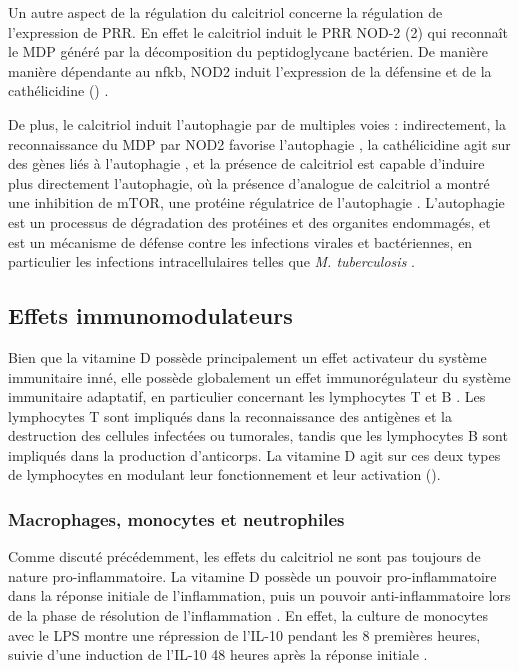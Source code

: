 \documentclass[
  a4paper,
  DIV=11,
  numbers=noendperiod,
  listof=totoc]{scrreprt}
\begin{document}
Un autre aspect de la régulation du calcitriol concerne la régulation de
l'expression de \ac{PRR}. En effet le calcitriol induit le \ac{PRR}
\acl{NOD}-2 (2) qui reconnaît le \ac{MDP} généré par la
décomposition du peptidoglycane bactérien. De manière manière dépendante
au \ac{nfkb}, NOD2 induit l'expression de la défensine  et de
la cathélicidine ()
\autocite{Bishop.2021,Ismailova.2022}.

De plus, le calcitriol induit l'autophagie par de multiples voies :
indirectement, la reconnaissance du \ac{MDP} par NOD2 favorise
l'autophagie \autocite{Bishop.2021}, la cathélicidine agit sur des gènes
liés à l'autophagie \autocite{Yuk.2009}, et la présence de calcitriol
est capable d'induire plus directement l'autophagie, où la présence
d'analogue de calcitriol a montré une inhibition de mTOR, une protéine
régulatrice de l'autophagie \autocite{Yuk.2009}. L'autophagie est un
processus de dégradation des protéines et des organites endommagés, et
est un mécanisme de défense contre les infections virales et
bactériennes, en particulier les infections intracellulaires telles que
\emph{M. tuberculosis} \autocite{Liu.2006}.

\subsection{Effets immunomodulateurs}\label{sec-immunomodulateur}

Bien que la vitamine D possède principalement un effet activateur du
système immunitaire inné, elle possède globalement un effet
immunorégulateur du système immunitaire adaptatif, en particulier
concernant les lymphocytes T et B \autocite{Bishop.2021}. Les
lymphocytes T sont impliqués dans la reconnaissance des antigènes et la
destruction des cellules infectées ou tumorales, tandis que les
lymphocytes B sont impliqués dans la production d'anticorps. La vitamine
D agit sur ces deux types de lymphocytes en modulant leur fonctionnement
et leur activation ().

\subsubsection{Macrophages, monocytes et
neutrophiles}\label{macrophages-monocytes-et-neutrophiles}

Comme discuté précédemment, les effets du calcitriol ne sont pas
toujours de nature pro-inflammatoire. La vitamine D possède un pouvoir
pro-inflammatoire dans la réponse initiale de l'inflammation, puis un
pouvoir anti-inflammatoire lors de la phase de résolution de
l'inflammation \autocite{Dankers.2017}. En effet, la culture de
monocytes avec le \ac{LPS} montre une répression de l'\ac{IL-10} pendant
les 8 premières heures, suivie d'une induction de l'IL-10 48 heures
après la réponse initiale \autocite{Matilainen.2010}.
\end{document}
